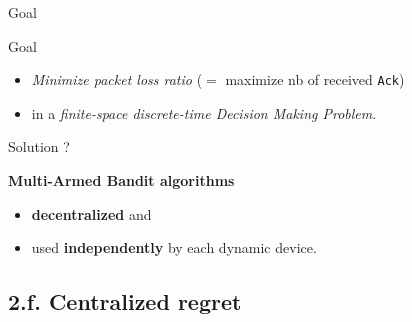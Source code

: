 \documentclass[12pt,english,ignorenonframetext,]{beamer}
\providecommand{\tightlist}{%
  \setlength{\itemsep}{0pt}\setlength{\parskip}{0pt}}
\begin{document}
\begin{frame}{Goal}

\begin{block}{Goal}
  \begin{itemize}\tightlist
    \item
    \emph{Minimize packet loss ratio} \newline
    (\(=\) maximize nb of received \texttt{Ack})
    \item
    in a \emph{finite-space discrete-time Decision Making Problem}.
  \end{itemize}
\end{block}

\vspace*{20pt}

\pause

\begin{block}{Solution ?}

  \textbf{Multi-Armed Bandit algorithms}
  \begin{itemize}\tightlist
    \item
    \textbf{decentralized} and
    \item
    used \textbf{independently} by each dynamic device.
  \end{itemize}


\end{block}




\end{frame}


\subsection{\hfill{}2.f. Centralized regret\hfill{}}
\end{document}

